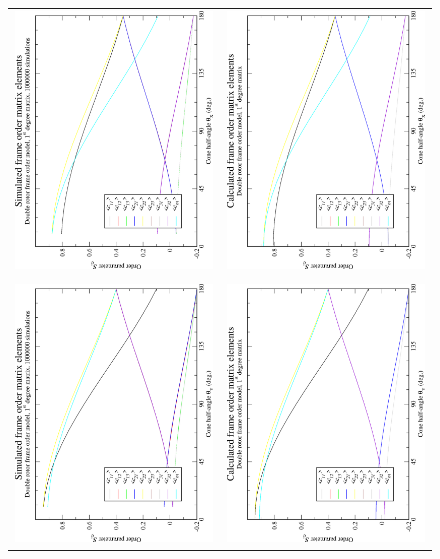 \begin{figure}
\centering
  \begin{tabular}{@{}cc@{}}
    \includegraphics[width=.35\textwidth,angle=270]{images/frame_order_matrix/Sij_double_rotor_out_of_frame_theta_x_ens1000000.eps} &
    \includegraphics[width=.35\textwidth,angle=270]{images/frame_order_matrix/Sij_double_rotor_out_of_frame_theta_x_calc.eps} \\
    \\[-5pt]
    \includegraphics[width=.35\textwidth,angle=270]{images/frame_order_matrix/Sij_double_rotor_out_of_frame_theta_y_ens1000000.eps} &
    \includegraphics[width=.35\textwidth,angle=270]{images/frame_order_matrix/Sij_double_rotor_out_of_frame_theta_y_calc.eps} \\

\end{tabular}
\end{figure}
